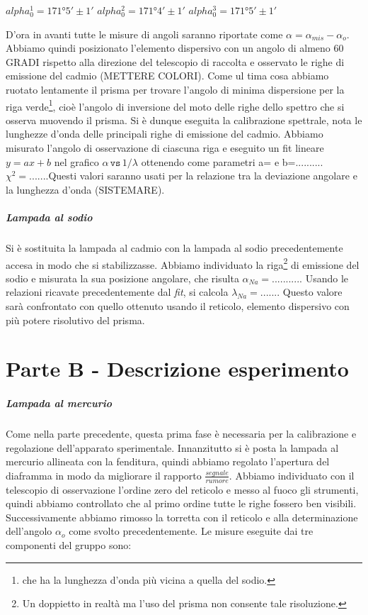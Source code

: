 \documentclass[10pt,a4paper]{article}
\begin{document}
$alpha_0^{1} = 171°5'\pm1'$
$alpha_0^{2} = 171°4'\pm1'$
$alpha_0^{3} = 171°5'\pm1'$

D'ora in avanti tutte le misure di angoli saranno riportate come $\alpha=\alpha_{mis}-\alpha_o$. Abbiamo quindi posizionato l'elemento dispersivo con un angolo di almeno 60 GRADI rispetto alla direzione del telescopio di raccolta e osservato le righe di emissione del cadmio (METTERE COLORI). Come ul
tima cosa abbiamo ruotato lentamente il prisma per trovare l'angolo di minima dispersione per la riga verde\footnote{che ha la lunghezza d'onda più vicina a quella del sodio.}, cioè l'angolo di inversione del moto delle righe dello spettro che si osserva muovendo il prisma. 
Si è dunque eseguita la calibrazione spettrale, nota le lunghezze d'onda delle principali righe di emissione del cadmio. Abbiamo misurato l'angolo di osservazione di ciascuna riga e eseguito un fit lineare $y=ax+b$ nel grafico $\alpha\, \texttt{vs}\, 1/\lambda$ ottenendo come parametri a=  e b=.......... $\chi^2=......$.Questi valori saranno usati per la relazione tra la deviazione angolare e la lunghezza d'onda (SISTEMARE).\\
\subparagraph{Lampada al sodio}
Si è sostituita la lampada al cadmio con la lampada al sodio precedentemente accesa in modo che si stabilizzasse. Abbiamo individuato la riga\footnote{Un doppietto in realtà ma l'uso del prisma non consente tale risoluzione.} di emissione del sodio e misurata la sua posizione angolare, che risulta $\alpha_{Na}=..........$. Usando le relazioni ricavate precedentemente dal \emph{fit}, si calcola $\lambda_{Na}=......$. Questo valore sarà confrontato con quello ottenuto usando il reticolo, elemento dispersivo con più potere risolutivo del prisma.
\section{Parte B - Descrizione esperimento}
\subparagraph{Lampada al mercurio}
Come nella parte precedente, questa prima fase è necessaria per la calibrazione e regolazione dell'apparato sperimentale. Innanzitutto si è posta la lampada al mercurio allineata con la fenditura, quindi abbiamo regolato l'apertura del diaframma in modo da migliorare il rapporto $\frac{segnale}{rumore}$. Abbiamo individuato con il telescopio di osservazione l'ordine zero del reticolo e messo al fuoco gli strumenti, quindi abbiamo controllato che al primo ordine tutte le righe fossero ben visibili. Successivamente abbiamo rimosso la torretta con il reticolo e  alla determinazione dell'angolo  $\alpha_o$ come svolto precedentemente. Le misure eseguite dai tre componenti del gruppo sono:
\end{document}
